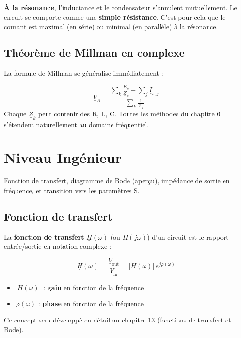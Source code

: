 \documentclass[12pt,a4paper,twoside]{book}
\begin{document}
\begin{intuition}
\textbf{À la résonance}, l'inductance et le condensateur s'annulent mutuellement. Le circuit se comporte comme une \textbf{simple résistance}. C'est pour cela que le courant est maximal (en série) ou minimal (en parallèle) à la résonance.
\end{intuition}

\subsection{Théorème de Millman en complexe}

La formule de Millman se généralise immédiatement :
\begin{formule}
\[
\boxed{\underline{V}_A = \frac{\displaystyle\sum_k \frac{\underline{E}_k}{\underline{Z}_k} + \sum_j \underline{I}_{s,j}}{\displaystyle\sum_k \frac{1}{\underline{Z}_k}}}
\]
Chaque $\underline{Z}_k$ peut contenir des R, L, C. Toutes les méthodes du chapitre 6 s'étendent naturellement au domaine fréquentiel.
\end{formule}

\section{Niveau Ingénieur}

\begin{ingenieur}
Fonction de transfert, diagramme de Bode (aperçu), impédance de sortie en fréquence, et transition vers les paramètres S.
\end{ingenieur}

\subsection{Fonction de transfert}

La \textbf{fonction de transfert} $\underline{H}(\omega)$ (ou $H(j\omega)$) d'un circuit est le rapport entrée/sortie en notation complexe :

\begin{formule}
\[
\boxed{\underline{H}(\omega) = \frac{\underline{V}_{\text{out}}}{\underline{V}_{\text{in}}} = |H(\omega)|\,e^{j\varphi(\omega)}}
\]
\begin{itemize}[nosep]
\item $|H(\omega)|$ : \textbf{gain} en fonction de la fréquence
\item $\varphi(\omega)$ : \textbf{phase} en fonction de la fréquence
\end{itemize}
Ce concept sera développé en détail au chapitre 13 (fonctions de transfert et Bode).
\end{formule}
\end{document}
